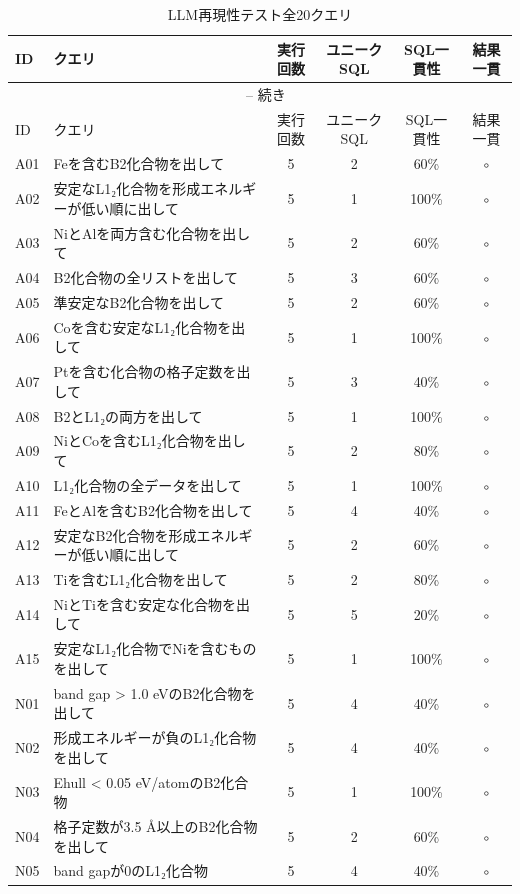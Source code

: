 \documentclass[3p]{elsarticle}
\begin{document}
\begin{longtable}{lp{5cm}cccc}
\caption{LLM再現性テスト全20クエリ}
\label{tab:repro_full} \\
\toprule
ID & クエリ & 実行回数 & ユニークSQL & SQL一貫性 & 結果一貫 \\
\midrule
\endfirsthead
\multicolumn{6}{c}{\tablename~\thetable{} -- 続き} \\
\toprule
ID & クエリ & 実行回数 & ユニークSQL & SQL一貫性 & 結果一貫 \\
\midrule
\endhead
\bottomrule
\endfoot

  A01 & Feを含むB2化合物を出して & 5 & 2 & 60\% & $\circ$ \\
  A02 & 安定なL1₂化合物を形成エネルギーが低い順に出して & 5 & 1 & 100\% & $\circ$ \\
  A03 & NiとAlを両方含む化合物を出して & 5 & 2 & 60\% & $\circ$ \\
  A04 & B2化合物の全リストを出して & 5 & 3 & 60\% & $\circ$ \\
  A05 & 準安定なB2化合物を出して & 5 & 2 & 60\% & $\circ$ \\
  A06 & Coを含む安定なL1₂化合物を出して & 5 & 1 & 100\% & $\circ$ \\
  A07 & Ptを含む化合物の格子定数を出して & 5 & 3 & 40\% & $\circ$ \\
  A08 & B2とL1₂の両方を出して & 5 & 1 & 100\% & $\circ$ \\
  A09 & NiとCoを含むL1₂化合物を出して & 5 & 2 & 80\% & $\circ$ \\
  A10 & L1₂化合物の全データを出して & 5 & 1 & 100\% & $\circ$ \\
  A11 & FeとAlを含むB2化合物を出して & 5 & 4 & 40\% & $\circ$ \\
  A12 & 安定なB2化合物を形成エネルギーが低い順に出して & 5 & 2 & 60\% & $\circ$ \\
  A13 & Tiを含むL1₂化合物を出して & 5 & 2 & 80\% & $\circ$ \\
  A14 & NiとTiを含む安定な化合物を出して & 5 & 5 & 20\% & $\circ$ \\
  A15 & 安定なL1₂化合物でNiを含むものを出して & 5 & 1 & 100\% & $\circ$ \\
  N01 & band gap > 1.0 eVのB2化合物を出して & 5 & 4 & 40\% & $\circ$ \\
  N02 & 形成エネルギーが負のL1₂化合物を出して & 5 & 4 & 40\% & $\circ$ \\
  N03 & Ehull < 0.05 eV/atomのB2化合物 & 5 & 1 & 100\% & $\circ$ \\
  N04 & 格子定数が3.5 Å以上のB2化合物を出して & 5 & 2 & 60\% & $\circ$ \\
  N05 & band gapが0のL1₂化合物 & 5 & 4 & 40\% & $\circ$ \\
\end{longtable}
\newpage
\end{document}
